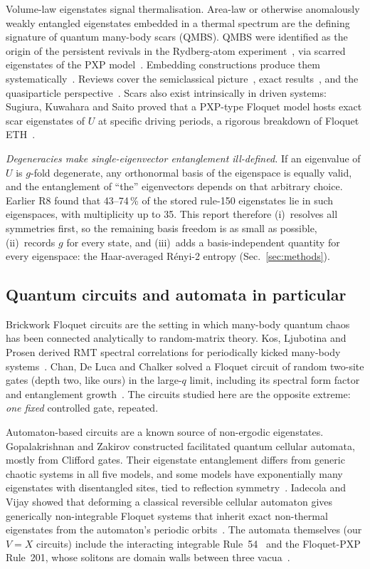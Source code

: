 Volume-law eigenstates signal thermalisation. Area-law or otherwise anomalously
weakly entangled eigenstates embedded in a thermal spectrum are the defining
signature of quantum many-body scars (QMBS). QMBS were identified as the origin
of the persistent revivals in the Rydberg-atom experiment~\cite{bernien2017},
via scarred eigenstates of the PXP model~\cite{turner2018}. Embedding
constructions produce them systematically~\cite{shiraishi2017}. Reviews cover
the semiclassical picture~\cite{serbyn2021}, exact
results~\cite{moudgalya2022review}, and the quasiparticle
perspective~\cite{chandran2023}. Scars also exist intrinsically in driven
systems: Sugiura, Kuwahara and Saito proved that a PXP-type Floquet model hosts
exact scar eigenstates of $U$ at specific driving periods, a rigorous breakdown
of Floquet ETH~\cite{sugiura2021}.

\emph{Degeneracies make single-eigenvector entanglement ill-defined.} If an
eigenvalue of $U$ is $g$-fold degenerate, any orthonormal basis of the
eigenspace is equally valid, and the entanglement of ``the'' eigenvectors
depends on that arbitrary choice. Earlier R8 found that 43--74\,\% of the stored
rule-150 eigenstates lie in such eigenspaces, with multiplicity up to 35. This
report therefore (i)~resolves all symmetries first, so the remaining basis
freedom is as small as possible, (ii)~records $g$ for every state, and (iii)~adds
a basis-independent quantity for every eigenspace: the Haar-averaged R\'enyi-2
entropy (Sec.~\ref{sec:methods}).

\subsection{Quantum circuits and automata in particular}

Brickwork Floquet circuits are the setting in which many-body quantum chaos has
been connected analytically to random-matrix theory. Kos, Ljubotina and Prosen
derived RMT spectral correlations for periodically kicked many-body
systems~\cite{kos2018}. Chan, De Luca and Chalker solved a Floquet circuit of
random two-site gates (depth two, like ours) in the large-$q$ limit, including
its spectral form factor and entanglement growth~\cite{chan2018}. The circuits
studied here are the opposite extreme: \emph{one fixed} controlled gate,
repeated.

Automaton-based circuits are a known source of non-ergodic eigenstates.
Gopalakrishnan and Zakirov constructed facilitated quantum cellular automata,
mostly from Clifford gates. Their eigenstate entanglement differs from generic
chaotic systems in all five models, and some models have exponentially many
eigenstates with disentangled sites, tied to reflection
symmetry~\cite{gopalakrishnan2018}. Iadecola and Vijay showed that deforming a
classical reversible cellular automaton gives generically non-integrable Floquet
systems that inherit exact non-thermal eigenstates from the automaton's periodic
orbits~\cite{iadecola2020}. The automata themselves (our $V=X$ circuits) include
the interacting integrable Rule~54~\cite{buca2021} and the Floquet-PXP Rule~201,
whose solitons are domain walls between three vacua~\cite{wilkinson2020}.

